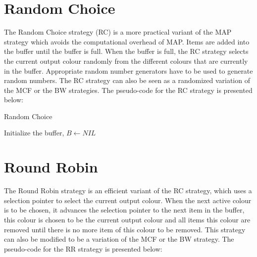 \section{Random Choice} \label{rc}
The Random Choice strategy (RC) is a more practical variant of the MAP strategy
which avoids the computational overhead of MAP. Items are added into the
buffer until the buffer is full. When the buffer is full, the RC strategy
selects the current output colour randomly from the different colours that are
currently in the buffer. Appropriate random number generators have to be used
to generate random numbers. The RC strategy can also be seen as a randomized
variation of the MCF or the BW strategies. The pseudo-code for the RC strategy
is presented below:

\begin{algorithm}
\caption{Random Choice}
\label{randomchoice}
Initialize the buffer, $B \gets NIL$ \;
\end{algorithm}

\section{Round Robin} \label{rr}
The Round Robin strategy is an efficient variant of the RC strategy, which uses
a selection pointer to select the current output colour. When the next active
colour is to be chosen, it advances the selection pointer to the next item in
the buffer, this colour is chosen to be the current output colour and all items
this colour are removed until there is no more item of this colour to be
removed. This strategy can also be modified to be a variation of the MCF or the
BW strategy. The pseudo-code for the RR strategy is presented below:

